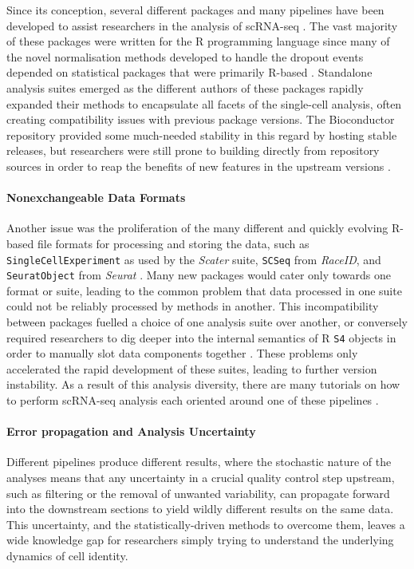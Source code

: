\documentclass[a4paper,num-refs]{oup-contemporary}
\newcommand{\prog}[1]{\textit{#1}} %
\newcommand{\fileformat}[1]{\texttt{#1}} %
\begin{document}
Since its conception, several different packages and many pipelines have been developed to assist researchers in the analysis of scRNA-seq \citep{mccarthy2017scater,satija2015seurat}. The vast majority of these packages were written for the R programming language since many of the novel normalisation methods developed to handle the dropout events depended on statistical packages that were primarily R-based \citep{amezquita2019orchestrating}. Standalone analysis suites emerged as the different authors of these packages rapidly expanded their methods to encapsulate all facets of the single-cell analysis, often creating compatibility issues with previous package versions. The Bioconductor repository provided some much-needed stability in this regard by hosting stable releases, but researchers were still prone to building directly from repository sources in order to reap the benefits of new features in the upstream versions \citep{seuratreleases,scanpyreleases}.


\paragraph{Nonexchangeable Data Formats}
Another issue was the proliferation of the many different and quickly evolving R-based file formats for processing and storing the data, such as \fileformat{SingleCellExperiment} as used by the \prog{Scater} suite, \fileformat{SCSeq} from \prog{RaceID}, and \fileformat{SeuratObject} from \prog{Seurat} \citep{lun2018singlecellexperiment,grun2015raceid}.
Many new packages would cater only towards one format or suite, leading to the common problem that data processed in one suite could not be reliably processed by methods in another. This incompatibility between packages fuelled a choice of one analysis suite over another, or conversely required researchers to dig deeper into the internal semantics of R \fileformat{S4} objects in order to manually slot data components together \citep{ruckdeschel2006s4}. These problems only accelerated the rapid development of these suites, leading to further version instability. As a result of this analysis diversity, there are many tutorials on how to perform scRNA-seq analysis each oriented around one of these pipelines \citep{luecken2019current}.

\paragraph{Error propagation and Analysis Uncertainty}
Different pipelines produce different results, where the stochastic nature of the analyses means that any uncertainty in a crucial quality control step upstream, such as filtering or the removal of unwanted variability,
can propagate forward into the downstream sections to yield wildly different results on the same data. This uncertainty, and the statistically-driven methods to overcome them,
leaves a wide knowledge gap
for researchers simply trying to understand the underlying dynamics of cell identity.
\end{document}
